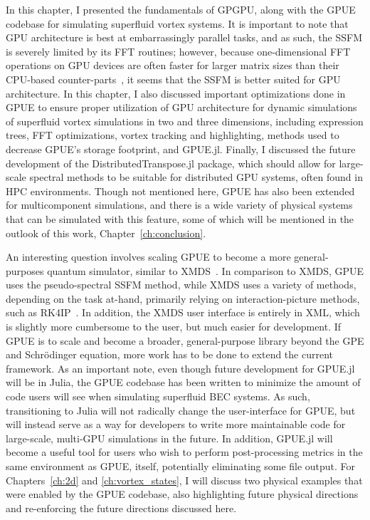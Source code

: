 In this chapter, I presented the fundamentals of GPGPU, along with the GPUE codebase for simulating superfluid vortex systems.
It is important to note that GPU architecture is best at embarrassingly parallel tasks, and as such, the SSFM is severely limited by its FFT routines; however, because one-dimensional FFT operations on GPU devices are often faster for larger matrix sizes than their CPU-based counter-parts~\cite{merz2016}, it seems that the SSFM is better suited for GPU architecture.
In this chapter, I also discussed important optimizations done in GPUE to ensure proper utilization of GPU architecture for dynamic simulations of superfluid vortex simulations in two and three dimensions, including expression trees, FFT optimizations, vortex tracking and highlighting, methods used to decrease GPUE's storage footprint, and GPUE.jl.
Finally, I discussed the future development of the DistributedTranspose.jl package, which should allow for large-scale spectral methods to be suitable for distributed GPU systems, often found in HPC environments.
Though not mentioned here, GPUE has also been extended for multicomponent simulations, and there is a wide variety of physical systems that can be simulated with this feature, some of which will be mentioned in the outlook of this work, Chapter~\ref{ch:conclusion}.

An interesting question involves scaling GPUE to become a more general-purposes quantum simulator, similar to XMDS~\cite{dennis2013}.
In comparison to XMDS, GPUE uses the pseudo-spectral SSFM method, while XMDS uses a variety of methods, depending on the task at-hand, primarily relying on interaction-picture methods, such as RK4IP~\cite{murray2011}.
In addition, the XMDS user interface is entirely in XML, which is slightly more cumbersome to the user, but much easier for development.
If GPUE is to scale and become a broader, general-purpose library beyond the GPE and Schr\"odinger equation, more work has to be done to extend the current framework.
As an important note, even though future development for GPUE.jl will be in Julia, the GPUE codebase has been written to minimize the amount of code users will see when simulating superfluid BEC systems.
As such, transitioning to Julia will not radically change the user-interface for GPUE, but will instead serve as a way for developers to write more maintainable code for large-scale, multi-GPU simulations in the future.
In addition, GPUE.jl will become a useful tool for users who wish to perform post-processing metrics in the same environment as GPUE, itself, potentially eliminating some file output.
For Chapters~\ref{ch:2d} and \ref{ch:vortex_states}, I will discuss two physical examples that were enabled by the GPUE codebase, also highlighting future physical directions and re-enforcing the future directions discussed here.
